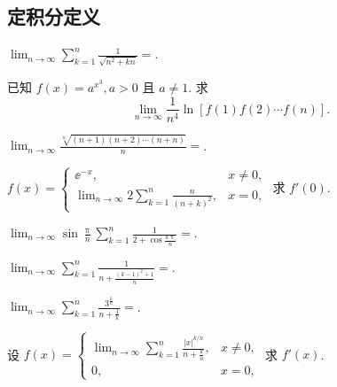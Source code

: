 \subsection{定积分定义}

	\begin{ti}
		$\lim_{n \to \infty} \sum_{k=1}^{n} \frac{1}{\sqrt{n^{2} + kn}} = $\htwo.
	\end{ti}

	\begin{ti}
		已知 $f(x) = a^{x^{3}}, a > 0$ 且 $a \ne 1$. 求
		\[
			\lim_{n \to \infty} \frac{1}{n^{4}}  \ln \left[ f(1) f(2) \cdots f(n) \right].
		\]
	\end{ti}

	\begin{ti}
		$\lim_{n \to \infty} \frac{\sqrt[n]{(n + 1) (n + 2) \cdots (n + n)}}{n} = $\htwo.
	\end{ti}

	\begin{ti}
		$f(x) = \begin{cases}
			\ee^{-x}, & x \ne 0,\\
			\lim_{n \to \infty} 2 \sum_{k=1}^{n} \frac{n}{(n + k)^{2}}, & x = 0,
		\end{cases}$ 求 $f'(0)$.
	\end{ti}

	\begin{ti}
		$\lim_{n \to \infty} \sin \frac{\uppi}{n} \sum_{k=1}^{n} \frac{1}{2 + \cos \frac{k \uppi}{n}} = $\htwo.
	\end{ti}

	\begin{ti}
		$\lim_{n \to \infty} \sum_{k=1}^{n} \frac{1}{n + \frac{(k - 1)^{2} + 1}{n}} = $\htwo.
	\end{ti}

	\begin{ti}
		$\lim_{n \to \infty} \sum_{k=1}^{n} \frac{3^{\frac{k}{n}}}{n + \frac{1}{k}} = $\htwo.
	\end{ti}

	\begin{ti}
		设 $f(x) = \begin{cases}
			\lim_{n \to \infty} \sum_{k=1}^{n} \frac{|x|^{k/n}}{n + \frac{k}{n}}, & x \ne 0,\\
			0, & x = 0,
		\end{cases}$ 求 $f'(x)$.
	\end{ti}